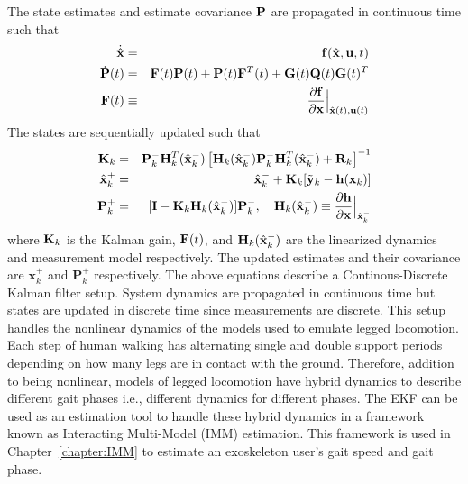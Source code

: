The state estimates and estimate covariance $ \P $ are propagated in continuous time such that
\begin{eqnarray}
	\dot{\hat{\x}} &=& \mathbf{f}(\hat{\x},\u,t) \\
	\dot{\P}(t) &=& \F(t)\P(t) + \P(t)\F^T(t) + \mathbf{G}(t)\Q(t)\mathbf{G}(t)^T \\ 
	\F(t) &\equiv& \frac{\partial \mathbf{f}}{\partial \x} \Bigr |_{\hat{\x}(t),\u(t)} \nonumber
\end{eqnarray}
%
\noindent The states are sequentially updated such that
\begin{eqnarray}
	\K_k &=& \P_k^- \H^T_k(\hat{\x}_k^-) \left[\H_k(\hat{\x}_k^-)\P_k^- \H^T_k(\hat{\x}_k^-) + \R_k\right]^{-1} \\
	\hat{\x}_k^+ &=& \hat{\x}_k^- + \K_k[\tilde{\y}_k-\mathbf{h}(\x_k)] \\
	\P_k^+ &=& [\mathbf{I} - \K_k \H_k(\hat{\x}_k^-)]\P_k^-,\quad \H_k(\hat{\x}_k^-) \equiv \frac{\partial \mathbf{h}}{\partial \x} \Bigr |_{\hat{\x}_k^-}
\end{eqnarray}
%
\noindent where $ \K_k $ is the Kalman gain, $ \F(t) $, and $ \H_k(\hat{\x}_k^-) $ are the linearized dynamics and measurement model respectively. The updated estimates and their covariance are $ \mathbf{x}_k^+ $ and $ \mathbf{P}_k^+ $ respectively. The above equations describe a Continous-Discrete Kalman filter setup. System dynamics are propagated in continuous time but states are updated in discrete time since measurements are discrete. This setup handles the nonlinear dynamics of the models used to emulate legged locomotion. Each step of human walking has alternating single and double support periods depending on how many legs are in contact with the ground. Therefore, addition to being nonlinear, models of legged locomotion have hybrid dynamics to describe different gait phases i.e., different dynamics for different phases. The EKF can be used as an estimation tool to handle these hybrid dynamics in a framework known as Interacting Multi-Model (IMM) estimation. This framework is used in Chapter~\ref{chapter:IMM} to estimate an exoskeleton user's gait speed and gait phase.